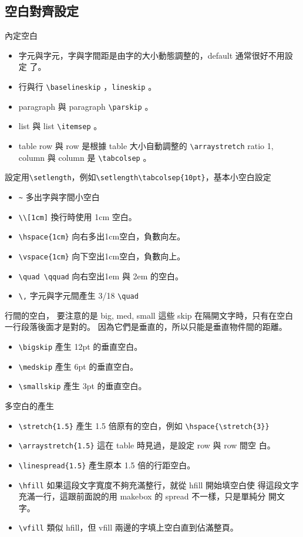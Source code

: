   \subsection{空白對齊設定}
  內定空白
  \begin{itemize}
    \item 字元與字元，字與字間距是由字的大小動態調整的，default 通常很好不用設定
      了。
    \item 行與行 \verb=\baselineskip= \the\baselineskip，\verb=lineskip=
      \the\lineskip 。
    \item paragraph 與 paragraph \verb=\parskip= \the\parskip。
    \item list 與 list \verb=\itemsep= \the\itemsep。
    \item table row 與 row 是根據 table 大小自動調整的 \verb=\arraystretch=
      ratio 1, column 與 column 是 \verb=\tabcolsep= \the\tabcolsep。
  \end{itemize}
  設定用\verb=\setlength=，例如\verb=\setlength\tabcolsep{10pt}=，基本小空白設定
  \begin{itemize}
    \item \verb=~= 多出字與字間小空白
    \item \verb=\\[1cm]= 換行時使用 1cm 空白。
    \item \verb=\hspace{1cm}= 向右多出1cm空白，負數向左。
    \item \verb=\vspace{1cm}= 向下空出1cm空白，負數向上。
    \item \verb=\quad \qquad= 向右空出1em 與 2em 的空白。
    \item \verb=\,= 字元與字元間產生 3/18 \verb=\quad=
  \end{itemize}
  行間的空白， 要注意的是 big, med, small 這些 skip 在隔開文字時，只有在空白
  一行段落後面才是對的。 因為它們是垂直的，所以只能是垂直物件間的距離。
  \begin{itemize}
    \item \verb=\bigskip= 產生 12pt 的垂直空白。
    \item \verb=\medskip= 產生 6pt 的垂直空白。
    \item \verb=\smallskip= 產生 3pt 的垂直空白。
  \end{itemize}
  多空白的產生
  \begin{itemize}
    \item \verb=\stretch{1.5}= 產生 1.5 倍原有的空白，例如
      \verb=\hspace{\stretch{3}}=
    \item \verb=\arraystretch{1.5}= 這在 table 時見過，是設定 row 與 row 間空
      白。
    \item \verb=\linespread{1.5}= 產生原本 1.5 倍的行距空白。
    \item \verb=\hfill= 如果這段文字寬度不夠充滿整行，就從 hfill 開始填空白使
      得這段文字充滿一行，這跟前面說的用 makebox 的 spread 不一樣，只是單純分
      開文字。
    \item \verb=\vfill= 類似 hfill，但 vfill 兩邊的字填上空白直到佔滿整頁。
  \end{itemize} 
